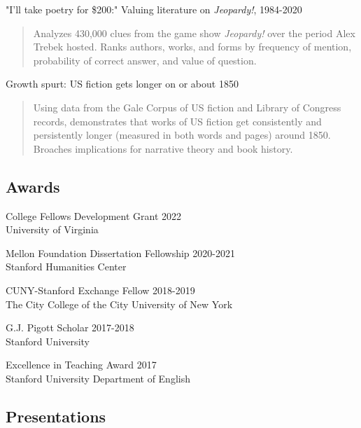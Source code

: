 \documentclass[
  12pt,
  letterpaper,
]{article}
\begin{document}
"I'll take poetry for \$200:" Valuing literature on \emph{Jeopardy!}, 1984-2020\\
\vspace{-1.5\baselineskip}
\begin{quote}
  Analyzes 430,000 clues from the game show \emph{Jeopardy!} over the period Alex Trebek hosted. Ranks authors, works, and forms by frequency of mention, probability of correct answer, and value of question.
\end{quote}

Growth spurt: US fiction gets longer on or about 1850\\
\vspace{-1.5\baselineskip}
\begin{quote}
  Using data from the Gale Corpus of US fiction and Library of Congress records, demonstrates that works of US fiction get consistently and persistently longer (measured in both words and pages) around 1850. Broaches implications for narrative theory and book history.
\end{quote}

\hypertarget{awards}{%
\subsection{Awards}\label{awards}}

College Fellows Development Grant \hfill 2022\\
\hspace*{0.333em} University of Virginia

Mellon Foundation Dissertation Fellowship \hfill 2020-2021\\
\hspace*{0.333em} Stanford Humanities Center

CUNY-Stanford Exchange Fellow \hfill 2018-2019\\
\hspace*{0.333em} The City College of the City University of New York

G.J. Pigott Scholar \hfill 2017-2018\\
\hspace*{0.333em} Stanford University

Excellence in Teaching Award \hfill 2017\\
\hspace*{0.333em} Stanford University Department of English

\hypertarget{presentations}{%
\subsection{Presentations}\label{presentations}}
\end{document}
